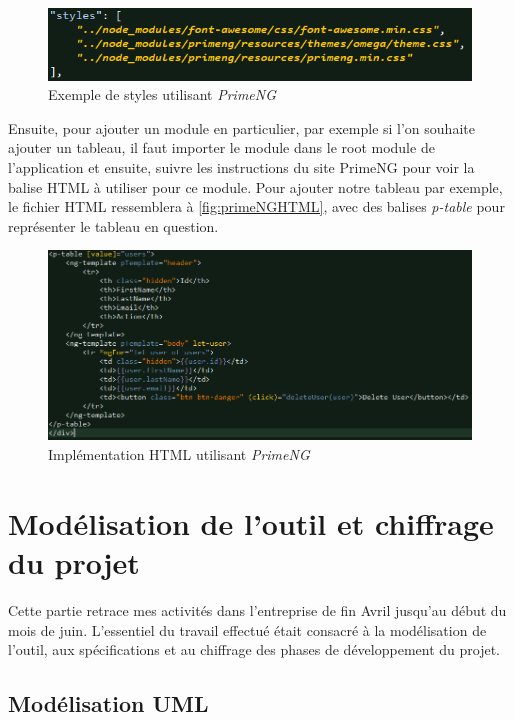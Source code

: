 \documentclass{polytech/polytech}
\begin{document}
\begin{figure}
	\includegraphics[scale=0.8]{images/styles_primeng}
	\caption{Exemple de styles utilisant \textit{PrimeNG}}
	\label{fig:stylesPrimeNG}
\end{figure}

Ensuite, pour ajouter un module en particulier, par exemple si l’on souhaite ajouter un tableau, il faut importer le module dans le root module de l’application et ensuite, suivre les instructions du site PrimeNG pour voir la balise HTML à utiliser pour ce module. Pour ajouter notre tableau par exemple, le fichier HTML ressemblera à \autoref{fig:primeNGHTML}, avec des balises \textit{p-table} pour représenter le tableau en question.

\begin{figure}
	\includegraphics[scale=0.65]{images/primeng_html}
	\caption{Implémentation HTML utilisant \textit{PrimeNG}}
	\label{fig:primeNGHTML}
\end{figure}


\part{Modélisation de l'outil et chiffrage du projet}

Cette partie retrace mes activités dans l'entreprise de fin Avril jusqu'au début du mois de juin. L'essentiel du travail effectué était consacré à la modélisation de l'outil, aux spécifications et au chiffrage des phases de développement du projet.  

\chapter{Modélisation UML}
\end{document}
